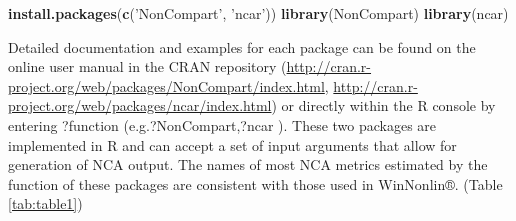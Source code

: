 \documentclass[12pt,]{krantz}
\newenvironment{Shaded}{\begin{snugshade}}{\end{snugshade}}
\newcommand{\KeywordTok}[1]{\textcolor[rgb]{0.13,0.29,0.53}{\textbf{#1}}}
\newcommand{\NormalTok}[1]{#1}
\newcommand{\StringTok}[1]{\textcolor[rgb]{0.31,0.60,0.02}{#1}}
\theoremstyle{definition}
\theoremstyle{definition}
\theoremstyle{definition}
\theoremstyle{remark}
\begin{document}
\begin{Shaded}
\begin{Highlighting}[]
\KeywordTok{install.packages}\NormalTok{(}\KeywordTok{c}\NormalTok{(}\StringTok{'NonCompart'}\NormalTok{, }\StringTok{'ncar'}\NormalTok{))}
\KeywordTok{library}\NormalTok{(NonCompart)}
\KeywordTok{library}\NormalTok{(ncar)}
\end{Highlighting}
\end{Shaded}

Detailed documentation and examples for each package can be found on the
online user manual in the CRAN repository
(\url{http://cran.r-project.org/web/packages/NonCompart/index.html},
\url{http://cran.r-project.org/web/packages/ncar/index.html}) or
directly within the R console by entering ?function
(e.g.?NonCompart,?ncar ). These two packages are implemented in R and
can accept a set of input arguments that allow for generation of NCA
output. The names of most NCA metrics estimated by the function of these
packages are consistent with those used in WinNonlin®. (Table
\ref{tab:table1})
\end{document}
